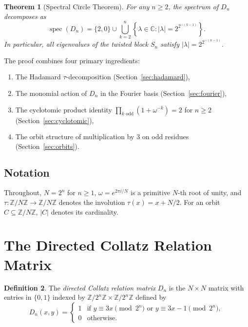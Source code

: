 \documentclass[11pt,reqno]{amsart}
\newtheorem{theorem}{Theorem}[section]
\theoremstyle{definition}
\newtheorem{definition}[theorem]{Definition}
\begin{document}
\begin{theorem}[Spectral Circle Theorem]\label{thm:main}
For any $n \ge 2$, the spectrum of $D_n$ decomposes as
\[
\operatorname{spec}(D_n) = \{2, 0\} \cup \bigcup_{k=2}^{n} \left\{ \lambda \in \mathbb{C} : |\lambda| = 2^{2^{-(k-1)}} \right\}.
\]
In particular, all eigenvalues of the twisted block $S_n$ satisfy $|\lambda| = 2^{2^{-(n-1)}}$.
\end{theorem}

The proof combines four primary ingredients:
\begin{enumerate}
\item The Hadamard $\tau$-decomposition (Section~\ref{sec:hadamard}),
\item The monomial action of $D_n$ in the Fourier basis (Section~\ref{sec:fourier}),
\item The cyclotomic product identity $\prod_{k \text{ odd}} (1 + \omega^{-k}) = 2$ for $n \ge 2$ (Section~\ref{sec:cyclotomic}),
\item The orbit structure of multiplication by 3 on odd residues (Section~\ref{sec:orbits}).
\end{enumerate}

\subsection{Notation}
Throughout, $N = 2^n$ for $n \ge 1$, $\omega = e^{2\pi i / N}$ is a primitive $N$-th root of unity, and $\tau \colon \mathbb{Z}/N\mathbb{Z} \to \mathbb{Z}/N\mathbb{Z}$ denotes the involution $\tau(x) = x + N/2$. For an orbit $C \subseteq \mathbb{Z}/N\mathbb{Z}$, $|C|$ denotes its cardinality.

\section{The Directed Collatz Relation Matrix}

\begin{definition}\label{def:collatz}
The \emph{directed Collatz relation matrix} $D_n$ is the $N \times N$ matrix with entries in $\{0, 1\}$ indexed by $\mathbb{Z}/2^n\mathbb{Z} \times \mathbb{Z}/2^n\mathbb{Z}$ defined by
\[
D_n(x, y) = \begin{cases} 1 & \text{if } y \equiv 3x \pmod{2^n} \text{ or } y \equiv 3x - 1 \pmod{2^n}, \\ 0 & \text{otherwise.} \end{cases}
\]
\end{definition}
\end{document}
